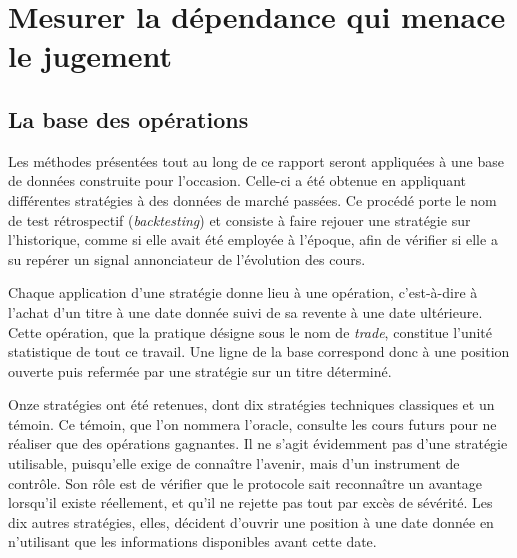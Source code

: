 \chapter{Mesurer la dépendance qui menace le jugement}
\label{chap:donnees}

\section{La base des opérations}
\label{sec:donnees-trades}

Les méthodes présentées tout au long de ce rapport seront appliquées à une
base de données construite pour l'occasion. Celle-ci a été obtenue en
appliquant différentes stratégies à des données de marché passées. Ce procédé
porte le nom de test rétrospectif (\emph{backtesting}) et consiste à faire
rejouer une stratégie sur l'historique, comme si elle avait été employée à
l'époque, afin de vérifier si elle a su repérer un signal annonciateur de
l'évolution des cours.

Chaque application d'une stratégie donne lieu à une opération, c'est-à-dire à
l'achat d'un titre à une date donnée suivi de sa revente à une date
ultérieure. Cette opération, que la pratique désigne sous le nom de
\emph{trade}, constitue l'unité statistique de tout ce travail. Une ligne de
la base correspond donc à une position ouverte puis refermée par une
stratégie sur un titre déterminé.

Onze stratégies ont été retenues, dont dix stratégies techniques classiques
et un témoin. Ce témoin, que l'on nommera l'oracle, consulte les cours futurs
pour ne réaliser que des opérations gagnantes. Il ne s'agit évidemment pas
d'une stratégie utilisable, puisqu'elle exige de connaître l'avenir, mais
d'un instrument de contrôle. Son rôle est de vérifier que le protocole sait
reconnaître un avantage lorsqu'il existe réellement, et qu'il ne rejette pas
tout par excès de sévérité. Les dix autres stratégies, elles, décident
d'ouvrir une position à une date donnée en n'utilisant que les informations
disponibles avant cette date.

